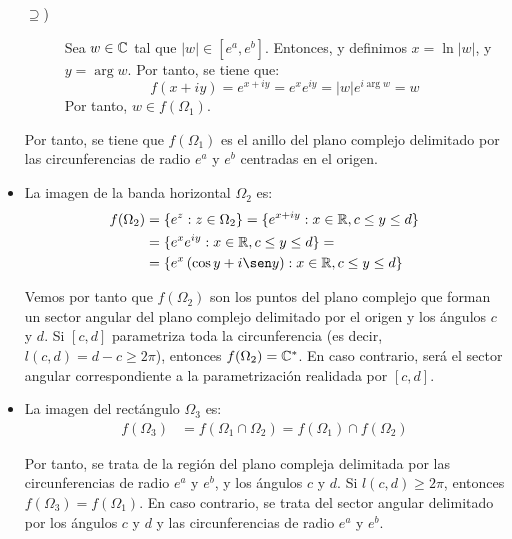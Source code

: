 \begin{ejercicio}
\begin{itemize}
\begin{description}
            \item[$\supseteq$)] Sea $w\in \mathbb{C}$ tal que $|w|\in [e^a,e^b]$. Entonces, y definimos $x=\ln |w|$, y $y = \arg w$. Por tanto, se tiene que:
            \begin{equation*}
                f(x+iy) = e^{x+iy} = e^x e^{iy} = |w|e^{i\arg w} = w
            \end{equation*}
            Por tanto, $w\in f(\Omega_1)$.
        \end{description}

        Por tanto, se tiene que $f(\Omega_1)$ es el anillo del plano complejo delimitado por las circunferencias de radio $e^a$ y $e^b$ centradas en el origen.

        \item La imagen de la banda horizontal $\Omega_2$ es:
        \begin{align*}
            f(\Omega_2) &= \{e^z : z\in \Omega_2\} = \{e^{x+iy} : x\in \bb{R}, c\leq y\leq d\} \\
            &= \{e^x e^{iy} : x\in \bb{R}, c\leq y\leq d\}
            =\\&= \{e^x\left(\cos y + i\sen y\right) : x\in \bb{R}, c\leq y\leq d\}
        \end{align*}

        Vemos por tanto que $f(\Omega_2)$ son los puntos del plano complejo que forman un sector angular del plano complejo delimitado por el origen y los ángulos $c$ y $d$. Si $[c,d]$ parametriza toda la circunferencia (es decir, $l(c,d)=d-c\geq 2\pi$), entonces $f(\Omega_2)=\mathbb{C}^*$. En caso contrario, será el sector angular correspondiente a la parametrización realidada por $[c,d]$.


        \item La imagen del rectángulo $\Omega_3$ es:
        \begin{align*}
            f(\Omega_3) &= f(\Omega_1\cap \Omega_2) = f(\Omega_1)\cap f(\Omega_2)
        \end{align*}

        Por tanto, se trata de la región del plano compleja delimitada por las circunferencias de radio $e^a$ y $e^b$, y los ángulos $c$ y $d$. Si $l(c,d)\geq 2\pi$, entonces $f(\Omega_3) = f(\Omega_1)$. En caso contrario, se trata del sector angular delimitado por los ángulos $c$ y $d$ y las circunferencias de radio $e^a$ y $e^b$.
    \end{itemize}
\end{ejercicio}

